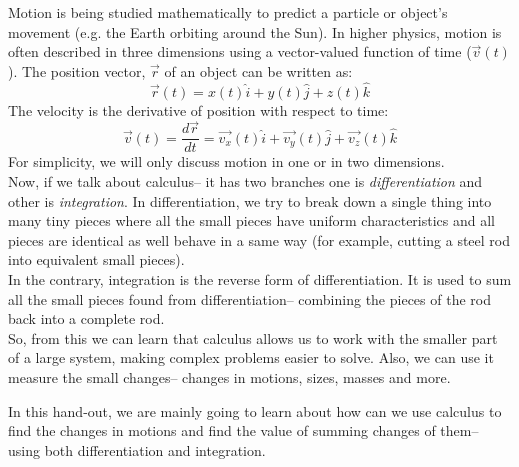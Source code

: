 \documentclass[12pt,a4paper]{article}
\begin{document}
Motion is being studied mathematically to predict a particle or object's movement (e.g. the Earth orbiting around the Sun). In higher physics, motion is often described in three dimensions using a vector-valued function of time ($\vec{v}(t)$). The position vector, $\vec{r}$ of an object can be written as:
\[
\vec{r}(t) = x(t) \hat{i} + y(t)\hat{j} + z(t) \hat{k}
\]
 The velocity is the derivative of position with respect to time:
\[
\vec{v} (t) = \frac{d\vec{r}}{dt} = \vec{v_x}(t)\hat{i}+ \vec{v_y}(t) \hat{j} + \vec{v_z}(t) \hat{k}
\]
For simplicity, we will only discuss motion in one or in two dimensions.\\
Now, if we talk about calculus--  it has two branches one is \textit{differentiation} and other is \textit{integration}. In differentiation, we try to break down a single thing into many tiny pieces where all the small pieces have uniform characteristics and all pieces are identical as well behave in a same way (for example, cutting a steel rod into equivalent small pieces).\\
In the contrary, integration is the reverse form of differentiation. It is used to sum all the small pieces found from differentiation-- combining the pieces of the rod back into a complete rod.\\
So, from this we can learn that calculus allows us to work with the smaller part of a large system, making complex problems easier to solve. Also, we can use it measure the small changes-- changes in motions, sizes, masses and more. 

In this hand-out, we are mainly going to learn about how can we use calculus to find the changes in motions and find the value of summing changes of them-- using both differentiation and integration.




\newpage

\end{document}
